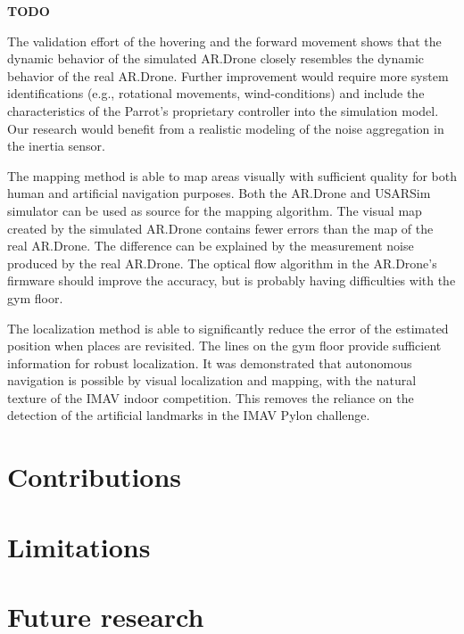 \textbf{TODO}

The validation effort of the hovering and the forward movement shows that the dynamic behavior of the simulated AR.Drone closely resembles the dynamic behavior of the real AR.Drone.
Further improvement would require more system identifications (e.g., rotational movements, wind-conditions) and include the characteristics of the Parrot's proprietary controller into the simulation model. 
Our research would benefit from a realistic modeling of the noise aggregation
in the inertia sensor.

The mapping method is able to map areas visually with sufficient quality for both human and artificial navigation purposes.
Both the AR.Drone and USARSim simulator can be used as source for the mapping algorithm.
The visual map created by the simulated AR.Drone contains fewer errors than the map of the real AR.Drone.
The difference can be explained by the measurement noise produced by the real AR.Drone.
The optical flow algorithm in the AR.Drone's firmware should improve the accuracy, but is probably having difficulties with the gym floor.

The localization method is able to significantly reduce the error of the estimated position when places are revisited.
The lines on the gym floor provide sufficient information for robust localization. It was demonstrated that autonomous navigation is possible by visual localization and mapping, with the natural texture of the IMAV indoor competition. This removes the reliance on the detection of the artificial landmarks in the IMAV Pylon challenge.
	\section{Contributions}
	\section{Limitations}
	\section{Future research}
